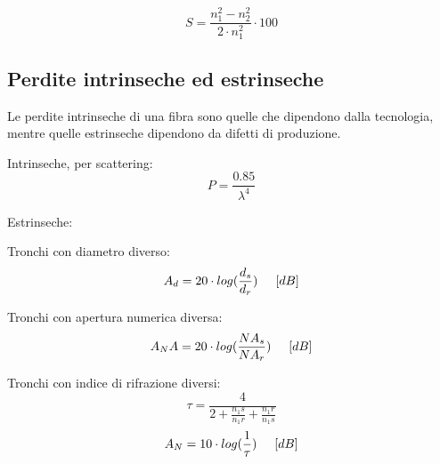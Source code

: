 \documentclass{article}
\begin{document}
    \begin{equation}
        S = \frac{n_1^2 - n_2^2}{2 \cdot n_1^2} \cdot 100
    \end{equation}

    \subsection{Perdite intrinseche ed estrinseche}

    Le perdite intrinseche di una fibra sono quelle che dipendono dalla tecnologia, mentre quelle estrinseche dipendono da
    difetti di produzione.

    Intrinseche, per scattering:
    \begin{equation}
        P = \frac{0.85}{\lambda ^ 4}
    \end{equation}

    Estrinseche:

    Tronchi con diametro diverso:
    \begin{equation}
        A_d = 20 \cdot log(\frac{d_s}{d_r}) \hspace{0.5cm} [dB]
    \end{equation}

    Tronchi con apertura numerica diversa:
    \begin{equation}
        A_NA = 20 \cdot log(\frac{NA_s}{NA_r}) \hspace{0.5cm} [dB]
    \end{equation}

    Tronchi con indice di rifrazione diversi:
    \begin{equation}
        \tau = \frac{4}{
            2 + \frac{n_1s}{n_1r} + \frac{n_1r}{n_1s}
        }
    \end{equation}
    \begin{equation}
        A_N = 10 \cdot log(\frac{1}{\tau}) \hspace{0.5cm} [dB]
    \end{equation}


    
\end{document}
